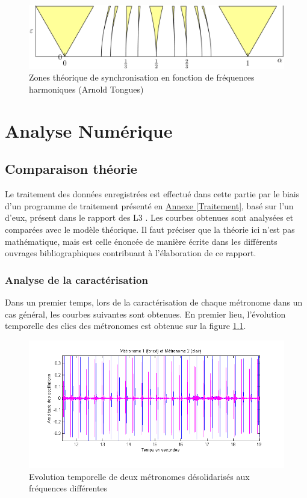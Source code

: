 \documentclass[a4paper,11pt]{report}
\begin{document}
\begin{figure}[h]
\centering
\includegraphics[width=1\textwidth]{Arnold_tongues}
\caption{Zones théorique de synchronisation en fonction de fréquences harmoniques (Arnold Tongues)}\label{ArnoldT}
\end{figure}

\chapter{Analyse Numérique}
\section{Comparaison théorie}
Le traitement des données enregistrées est effectué dans cette partie par le biais d'un programme de traitement présenté en \underline{Annexe \ref{Traitement}}, basé sur l'un d'eux, présent dans le rapport des L3 \cite{ram}. Les courbes obtenues sont analysées et comparées avec le modèle théorique. Il faut préciser que la théorie ici n'est pas mathématique, mais est celle énoncée de manière écrite dans les différents ouvrages bibliographiques contribuant à l'élaboration de ce rapport.

\subsection{Analyse de la caractérisation}
Dans un premier temps, lors de la caractérisation de chaque métronome dans un cas général, les courbes suivantes sont obtenues. En premier lieu, l'évolution temporelle des clics des métronomes est obtenue sur la figure \ref{CaractérisationT}.

\begin{figure}[h]
\centering
\includegraphics[width=1\textwidth]{Caracterisation_temporelle_200BPM}
\caption{Evolution temporelle de deux métronomes désolidarisés aux fréquences différentes}\label{CaractérisationT}
\end{figure}
\end{document}
